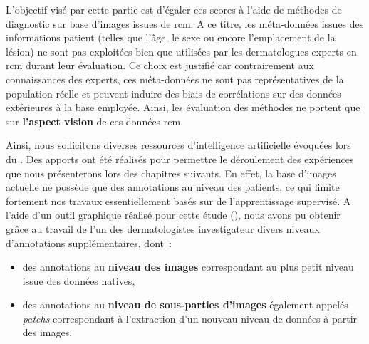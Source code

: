 L'objectif visé par cette partie est d'égaler ces scores à l'aide de méthodes de diagnostic sur base d'images issues de \gls{rcm}. A ce titre, les méta-données issues des informations patient (telles que l'âge, le sexe ou encore l'emplacement de la lésion) ne sont pas exploitées bien que utilisées par les dermatologues experts en \gls{rcm} durant leur évaluation. Ce choix est justifié car contrairement aux connaissances des experts, ces méta-données ne sont pas représentatives de la population réelle et peuvent induire des biais de corrélations sur des données extérieures à la base employée. Ainsi, les évaluation des méthodes ne portent que sur \textbf{l'aspect vision} de ces données \gls{rcm}.\par

Ainsi, nous sollicitons diverses ressources d'intelligence artificielle évoquées lors du . Des apports ont été réalisés pour permettre le déroulement des expériences que nous présenterons lors des chapitres suivants. En effet, la base d'images actuelle ne possède que des annotations au niveau des patients, ce qui limite fortement nos travaux essentiellement basés sur de l'apprentissage supervisé. A l'aide d'un outil graphique réalisé pour cette étude (), nous avons pu obtenir grâce au travail de l'un des dermatologistes investigateur divers niveaux d'annotations supplémentaires, dont~:
\begin{itemize}
    \item des annotations au \textbf{niveau des images} correspondant au plus petit niveau issue des données natives,
    \item des annotations au \textbf{niveau de sous-parties d'images} également appelés \textit{patchs} correspondant à l'extraction d'un nouveau niveau de données à partir des images.
\end{itemize}\par
\clearpage

